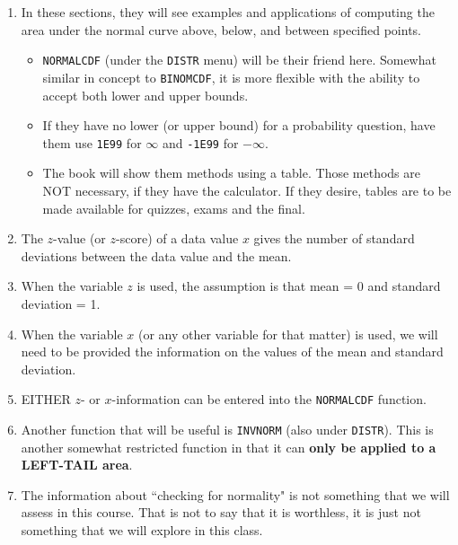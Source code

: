     \begin{enumerate}
    
        \item In these sections, they will see examples and applications of computing the area under the normal curve above, below, and between specified points.
        
            \begin{itemize}
            
                \item \texttt{NORMALCDF} (under the \texttt{DISTR} menu) will be their friend here.  Somewhat similar in concept to \texttt{BINOMCDF}, it is more flexible with the ability to accept both lower and upper bounds.
                
                \item If they have no lower (or upper bound) for a probability question, have them use \texttt{1E99} for $\infty$ and \texttt{-1E99} for $-\infty$. 
                
                \item The book will show them methods using a table. Those methods are NOT necessary, if they have the calculator. If they desire, tables are to be made available for quizzes, exams and the final.
                
            \end{itemize}
            
        \item The $z$-value (or $z$-score) of a data value $x$ gives the number of standard deviations between the data value and the mean.
        
        \item When the variable $z$ is used, the assumption is that mean = 0 and standard deviation = 1.
        
        \item When the variable $x$ (or any other variable for that matter) is used, we will need to be provided the information on the values of the mean and standard deviation.
        
        \item EITHER $z$- or $x$-information can be entered into the \texttt{NORMALCDF} function.
        
        \item Another function that will be useful is \texttt{INVNORM} (also under \texttt{DISTR}). This is another somewhat restricted function in that it can \textbf{only be applied to a LEFT-TAIL area}.
        
        \item The information about ``checking for normality" is not something that we will assess in this course.  That is not to say that it is worthless, it is just not something that we will explore in this class.
        
    \end{enumerate}